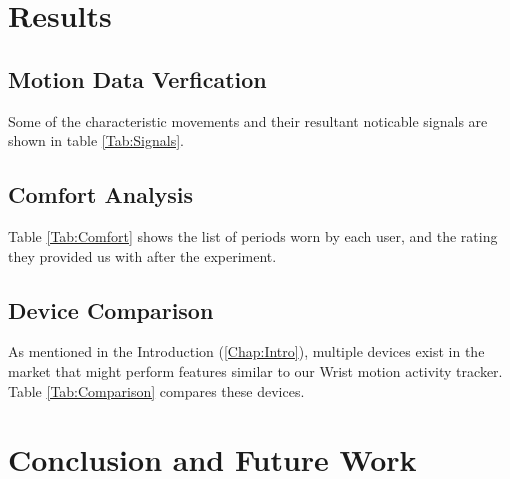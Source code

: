 \chapter{Results}
\label{Chap:Results}


\section{Motion Data Verfication}
\label{Motion Data}

Some of the characteristic movements and their resultant noticable signals are shown in table \ref{Tab:Signals}.

\section{Comfort Analysis}
\label{Sec:Comfort}

Table \ref{Tab:Comfort} shows the list of periods worn by each user,
and the rating they provided us with after the experiment.

\section{Device Comparison}
\label{Sec:Comparison}
As mentioned in the Introduction (\ref{Chap:Intro}),
multiple devices exist in the market that might perform features similar to our Wrist motion activity tracker.
Table \ref{Tab:Comparison} compares these devices.

\chapter{Conclusion and Future Work}

